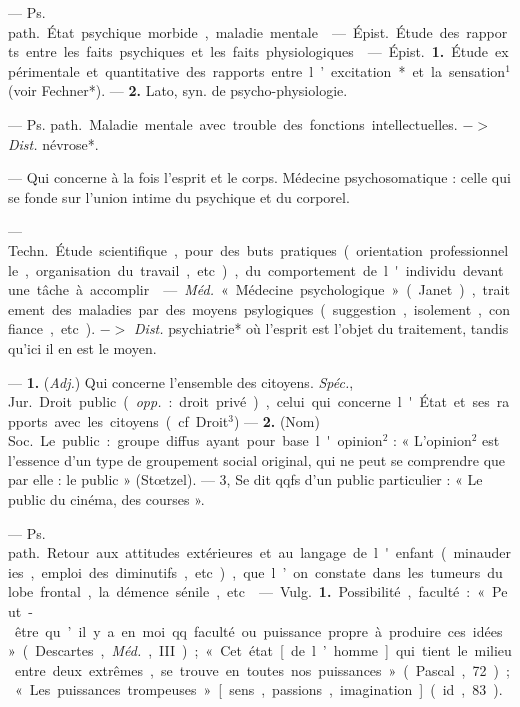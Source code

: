 \begin{itemize}[leftmargin=1cm, label=, itemsep=1pt]
 — \si{Ps. path.} État psychique morbide, maladie mentale.

 — \si{Épist.} Étude
des rapports entre les faits psychiques et les faits physiologiques.

 — \si{Épist.} {\bf 1.} Étude
expérimentale et quantitative des
rapports entre l’excitation* et la
sensation$^1$ (voir Fechner*). — {\bf 2.}
Lato, syn. de psycho-physiologie.

 — \si{Ps. path.} Maladie mentale
avec trouble des fonctions intellectuelles. $->$ {\it Dist.} névrose*.

 — Qui concerne à la
fois l'esprit et le corps. Médecine
psychosomatique : celle qui se fonde
sur l’union intime du psychique et
du corporel.

 — \si{Techn.} Étude
scientifique, pour des buts pratiques
(orientation professionnelle, organisation du travail, etc.), du comportement de l'individu devant une
tâche à accomplir.

 — \si{{\it Méd.}} « Médecine
psychologique » (Janet), traitement
des maladies par des moyens psylogiques (suggestion, isolement, confiance, etc). $->$ {\it Dist.} psychiatrie*
où l'esprit est l’objet du traitement,
tandis qu'ici il en est le moyen.

 — {\bf 1.} ({\it Adj.}) Qui concerne l’ensemble des citoyens. {\it Spéc.}, \si{Jur.}
Droit public ({\it opp.} : droit privé),
celui qui concerne l'État et ses rapports avec les citoyens (cf. Droit$^3$)
— {\bf 2.} (Nom) \si{Soc.} Le public : groupe
diffus ayant pour base l'opinion$^2$ :
« L'opinion$^2$ est l'essence d’un type
de groupement social original, qui ne
peut se comprendre que par elle : le
public » (Stœtzel). — 3, Se dit qqfs
d'un public particulier : « Le public
du cinéma, des courses ».

 — \si{Ps. path.} Retour aux
attitudes extérieures et au langage
de l'enfant (minauderies, emploi des
diminutifs, etc.), que l’on constate
dans les tumeurs du lobe frontal, la
démence sénile, etc.

 — \si{Vulg.} {\bf 1.} Possibilité,
faculté : « Peut-être qu’il y a en moi
qq. faculté ou puissance propre à
produire ces idées » (Descartes,
\si{{\it Méd.}}, III) ; « Cet état [de l’homme]
qui tient le milieu entre deux
extrêmes, se trouve en toutes nos
puissances » (Pascal, 72) ; « Les puissances trompeuses » [sens, passions,
imagination] (id., 83).


\end{itemize}
